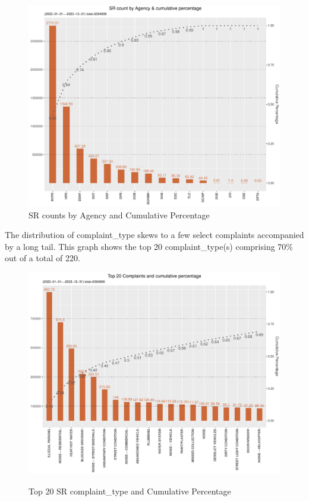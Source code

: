 \documentclass[12pt, titlepage]{article}
\begin{document}
\begin{figure}[tbp]
	\centering
  	\caption{SR counts by Agency and Cumulative Percentage}
	\includegraphics[width=\textwidth]{SRs_by_Agency.pdf}  
\end{figure}

The distribution of complaint\_type skews to a few select complaints accompanied by a long tail.
This graph shows the top 20 complaint\_type(s) comprising 70\% out of a total of 220.

\begin{figure}[tbp]
  \centering
  	\caption{Top 20 SR complaint\_type and Cumulative Percentage}
	  \includegraphics[width=\textwidth]{SR_by_Complaint_Type.pdf}  
	  \label{fig:SR_complaints}
\end{figure}
\end{document}
